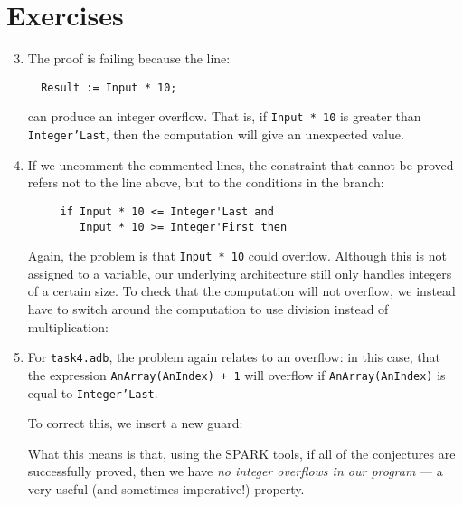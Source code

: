 \documentclass{article}
\def\rootdir{../}
\begin{document}
\lstset{language=,aboveskip=3mm}

\section*{Exercises}

\begin{enumerate}

\setcounter{enumi}{2}

 \item The proof is failing because the line:

 \begin{lstlisting}
  Result := Input * 10;
 \end{lstlisting}

  can produce an integer overflow. That is, if \texttt{Input * 10} is greater than \texttt{Integer'Last}, then the computation will give an unexpected value.

 \item If we uncomment the commented lines, the constraint that cannot be proved refers not to the line above, but to the conditions in the branch:

 \begin{lstlisting}
     if Input * 10 <= Integer'Last and
        Input * 10 >= Integer'First then
 \end{lstlisting}

Again, the problem is that \texttt{Input * 10} could overflow. Although this is not assigned to a variable, our underlying architecture still only handles integers of a certain size. To check that the computation will not overflow, we instead have to switch around the computation to use division instead of multiplication:

 

 \item For \texttt{task4.adb}, the problem again relates to an overflow: in this case, that the expression \texttt{AnArray(AnIndex) + 1} will overflow if \texttt{AnArray(AnIndex)} is equal to \texttt{Integer'Last}.

 To correct this, we insert a new guard:

 

What this means is that, using the SPARK tools, if all of the conjectures are successfully proved, then we have \emph{no integer overflows in our program} --- a very useful (and sometimes imperative!) property.


\end{enumerate}
\end{document}
